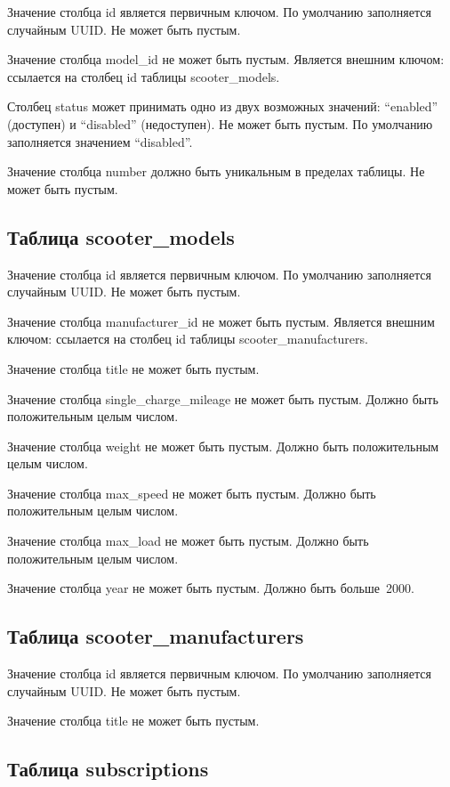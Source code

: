 Значение столбца id является первичным ключом. По умолчанию заполняется случайным UUID. Не может быть пустым.

Значение столбца model\_id не может быть пустым. Является внешним ключом: ссылается на столбец id таблицы scooter\_models.

Столбец status может принимать одно из двух возможных значений: \enquote{enabled} (доступен) и \enquote{disabled} (недоступен). Не может быть пустым. По умолчанию заполняется значением \enquote{disabled}.

Значение столбца number должно быть уникальным в пределах таблицы. Не может быть пустым.

\subsection*{Таблица scooter\_models}

Значение столбца id является первичным ключом. По умолчанию заполняется случайным UUID. Не может быть пустым.

Значение столбца manufacturer\_id не может быть пустым. Является внешним ключом: ссылается на столбец id таблицы scooter\_manufacturers.

Значение столбца title не может быть пустым.

Значение столбца single\_charge\_mileage не может быть пустым. Должно быть положительным целым числом.

Значение столбца weight не может быть пустым. Должно быть положительным целым числом.

Значение столбца max\_speed не может быть пустым. Должно быть положительным целым числом.

Значение столбца max\_load не может быть пустым. Должно быть положительным целым числом.

Значение столбца year не может быть пустым. Должно быть больше~2000.

\subsection*{Таблица scooter\_manufacturers}

Значение столбца id является первичным ключом. По умолчанию заполняется случайным UUID. Не может быть пустым.

Значение столбца title не может быть пустым.

\subsection*{Таблица subscriptions}

